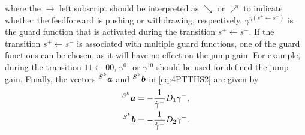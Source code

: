 \documentclass[../DC2019003Bouma.tex]{subfiles}
\begin{document}
\begin{sloppypar}
\begin{mydef}[PTTHS]
where the $\rightarrow$ left subscript should be interpreted as $\searrow$ or $\nearrow$ to indicate whether the feedforward is pushing or withdrawing, respectively. $\gamma^{\eta(s^+\leftarrow s^-)}$ is the guard function that is activated during the transition $s^+\leftarrow s^-$. If the transition $s^+\leftarrow s^-$ is associated with multiple guard functions, one of the guard functions can be chosen, as it will have no effect on the jump gain. For example, during the transition $11\leftarrow 00$, $\gamma^{01}$ or $\gamma^{10}$ should be used for defined the jump gain. Finally, the vectors $\hspace{0cm}^{S^k}{\boldsymbol{a}}$ and $\hspace{0cm}^{S^k}{\boldsymbol{b}}$ in \eqref{eq:4PTTHS2} are given by
\begin{align*}
\hspace{0cm}^{S^k}{\boldsymbol{a}} &= -\frac{1}{\dot{\gamma}^{-}}D_1\gamma^{-},\\
\hspace{0cm}^{S^k}{\boldsymbol{b}} &= -\frac{1}{\dot{\gamma}^{-}}D_2\gamma^{-}.
\end{align*}
\end{mydef}
\end{sloppypar}


%
%
%
%
%
%
\end{document}

